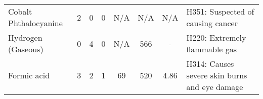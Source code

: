 \begin{landscape}
\begin{small}
\begin{longtable}{lcccS[table-format=3.1]S[table-format=3.0]S[table-format=5.8]l}
Cobalt Phthalocyanine                                                                     & 2                                       & 0                                             & 0                                           & {N/A}                                                                                   & {N/A}                                                                                                     & {N/A}                                                                                                   & H351: Suspected of causing cancer                                                                                                                                                                                                                                                                                                             \\ 
Hydrogen (Gaseous)                                                                        & 0                                       & 4                                             & 0                                           & {N/A}                                                                                   & 566                                                                                                     & {-}                                                                                                     & H220: Extremely flammable gas                                                                                                                                                                                                                                                                                                                 \\ 
Formic acid                                                                               & 3                                       & 2                                             & 1                                           & 69                                                                                    & 520                                                                                                     & 4.86                                                                                                  & H314: Causes severe skin burns and eye damage                                                                                                                                                                                                                                                                                                 \\ 

\end{longtable}
\end{small}
\end{landscape}
